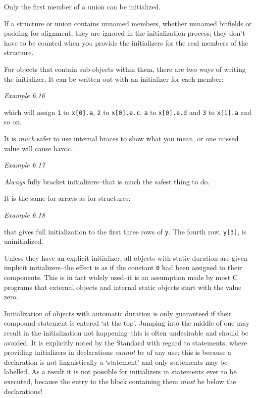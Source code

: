    Only the first member of a union can be initialized.


   If a structure or union contains unnamed members, whether unnamed
    bitfields or padding for alignment, they are ignored in the initialization
    process; they don't have to be counted when you provide the initializers
    for the real members of the structure.


   For objects that contain sub-objects within them, there are two ways of
    writing the initializer. It can be written out with an initializer for each
    member:


    \begin{center}\textit{Example 6.16}\end{center}


   which will assign \texttt{1} to \texttt{x[0].a}, \texttt{2}
    to \texttt{x[0].e.c}, \texttt{a} to \texttt{x[0].e.d} and
    \texttt{3} to \texttt{x[1].a} and so on.


   It is \textit{much} safer to use internal braces to show what you mean,
    or one missed value will cause havoc.


    \begin{center}\textit{Example 6.17}\end{center}


   \textit{Always} fully bracket initializers--that is much the safest
    thing to do.


   It is the same for arrays as for structures:


   \begin{center}\textit{Example 6.18}\end{center}


   that gives full initialization to the first three rows of \texttt{y}.
    The fourth row, \texttt{y[3]}, is uninitialized.


   Unless they have an explicit initializer, all objects with static
    duration are given implicit initializers--the effect is as if the
    constant \texttt{0} had been assigned to their components. This is in
    fact widely used--it is an assumption made by most C programs that
    external objects and internal static objects start with the value zero.


   Initialization of objects with automatic duration is only guaranteed if
    their compound statement is entered `at the top'. Jumping into the
    middle of one may result in the initialization not happening--this is
    often undesirable and should be avoided. It is explicitly noted by the
    Standard with regard to \switch{} statements, where providing
    initializers in declarations \textit{cannot} be of any use; this is because
    a declaration is not linguistically a `statement' and only statements
    may be labelled. As a result it is not possible for initializers in
    \switch{} statements ever to be executed, because the entry to
    the block containing them \textit{must} be below the declarations!


